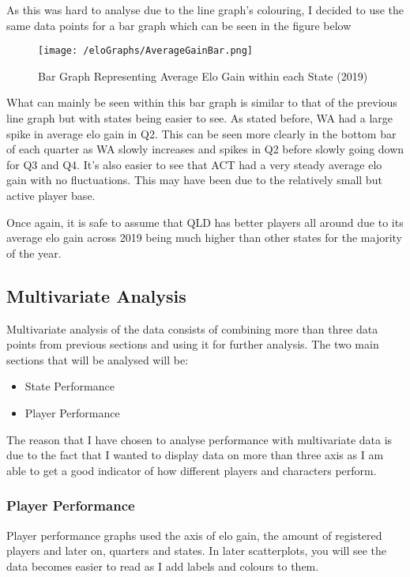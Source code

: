 \documentclass[11pt, oneside, a4paper]{article}
\begin{document}
As this was hard to analyse due to the line graph's colouring, I decided to use the same data points for a bar graph which can be seen in the figure below

\newpage
\begin{figure}[!ht]
	\centerline{\texttt{[image: /eloGraphs/AverageGainBar.png]}}
	\caption{Bar Graph Representing Average Elo Gain within each State  (2019)}
	\label{fig:figure2}
\end{figure}

What can mainly be seen within this bar graph is similar to that of the previous line graph but with states being easier to see. As stated before, WA had a large spike in average elo gain in Q2. This can be seen more clearly in the bottom bar of each quarter as WA slowly increases and spikes in Q2 before slowly going down for Q3 and Q4. It's also easier to see that ACT had a very steady average elo gain with no fluctuations. This may have been due to the relatively small but active player base. 

Once again, it is safe to assume that QLD has better players all around due to its average elo gain across 2019 being much higher than other states for the majority of the year.

\newpage
\subsection{Multivariate Analysis}
Multivariate analysis of the data consists of combining more than three data points from previous sections and using it for further analysis. The two main sections that will be analysed will be:

\begin{itemize}
	\item State Performance
	\item Player Performance
\end{itemize}

The reason that I have chosen to analyse performance with multivariate data is due to the fact that I wanted to display data on more than three axis as I am able to get a good indicator of how different players and characters perform.

\subsubsection{Player Performance}
Player performance graphs used the axis of elo gain, the amount of registered players and later on, quarters and states. In later scatterplots, you will see the data becomes easier to read as I add labels and colours to them.
\end{document}
